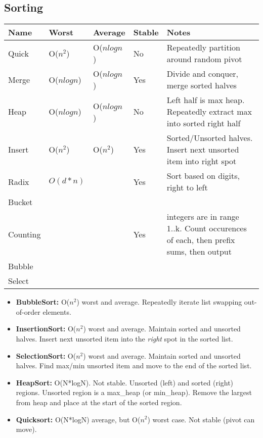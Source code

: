 \documentclass[12pt]{article}
\newcommand{\ONSQ}{O($n^2$) }
\newcommand{\ONLOGN}{O($nlogn$) }
\newcommand{\smaller}{\footnotesize}
\begin{document}
\subsection{Sorting}
\begin{center}
\begin{tabular} {l l l l p{9cm}}
Name & Worst & Average & Stable & Notes \\
\hline
Quick & \ONSQ & \ONLOGN & No & {\smaller Repeatedly partition around random pivot} \\ \hline
Merge & \ONLOGN & \ONLOGN & Yes & {\smaller Divide and conquer, merge sorted halves}\\ \hline
Heap & \ONLOGN & \ONLOGN & No & {\smaller Left half is max heap. Repeatedly extract max into sorted right half} \\ \hline
Insert & \ONSQ & \ONSQ & Yes & {\smaller Sorted/Unsorted halves. Insert next unsorted item into right spot} \\ \hline
Radix & $O(d*n)$ & & Yes & {\smaller Sort based on digits, right to left} \\ \hline
Bucket \\ \hline
Counting & & & Yes & integers are in range 1..k. Count occurences of each, then prefix sums, then output \\ \hline
Bubble \\ \hline
Select \\ \hline
\end{tabular}
\end{center}
\begin{itemize}
\item \textbf{BubbleSort:} \ONSQ worst and average. Repeatedly iterate list swapping out-of-order elements.
\item \textbf{InsertionSort:} \ONSQ worst and average. Maintain sorted and unsorted halves. Insert next unsorted item into the \emph{right} spot in the sorted list.
\item \textbf{SelectionSort:} \ONSQ worst and average. Maintain sorted and unsorted halves. Find max/min unsorted item and move to the end of the sorted list.
\item \textbf{HeapSort:} O(N*logN). Not stable. Unsorted (left) and sorted (right) regions. Unsorted region is a max\_heap (or min\_heap). Remove the largest from heap and place at the start of the sorted region. 
\item \textbf{Quicksort:} O(N*logN) average, but \ONSQ worst case. Not stable (pivot can move).
\end{itemize}
\end{document}
